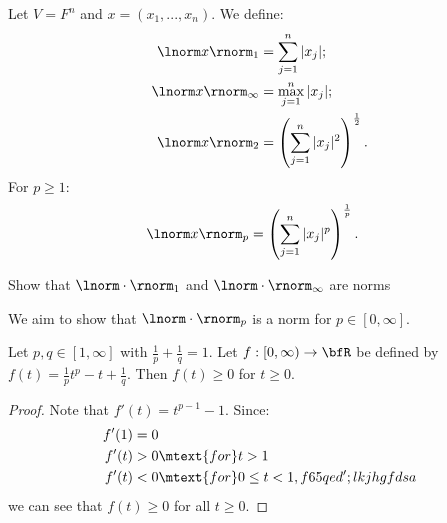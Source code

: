     \begin{example}
        Let $V = F^n$ and $x = (x_1,...,x_n)$. We define:
            \begin{equation*}
            \begin{split}
                \lnorm x \rnorm_1 &= \sum_{j  =1}^n |x_j|; \\
                \lnorm x \rnorm_\infty & = \max_{j=1}^n |x_j|; \\
                \lnorm x \rnorm_2 & = \left( \sum_{j = 1}^n |x_j|^2 \right)^{\frac{1}{2}}.
            \end{split}
            \end{equation*}
        For $p \geq 1$:
            \begin{equation*}
            \begin{split}
                \lnorm x \rnorm_p & = \left( \sum_{j = 1}^n |x_j|^p \right)^\frac{1}{p}.
            \end{split}
            \end{equation*}
    \end{example}

    \begin{exercise}
        Show that $\lnorm \cdot \rnorm_1$ and $\lnorm \cdot \rnorm_\infty$ are norms 
    \end{exercise}

    \begin{center}
    \end{center}

    We aim to show that $\lnorm \cdot \rnorm_p$ is a norm for $p \in [0,\infty]$.

    \begin{lemma}\label{lemma:lemnorm1}
        Let $p,q \in [1,\infty]$ with $\frac{1}{p} + \frac{1}{q} = 1$. Let $f:[0,\infty) \rightarrow \bfR$ be defined by $f(t) = \frac{1}{p}t^p - t + \frac{1}{q}$. Then $f(t) \geq 0$ for $t \geq 0$.
    \end{lemma}
        \begin{proof}
            Note that $f'(t) = t^{p-1} - 1$. Since:
                \begin{equation*}
                \begin{split}
                    f'(1) &= 0 \\
                    f'(t) &> 0 \mtext{for} t>1 \\
                    f'(t) &<0 \mtext{for} 0\leq t < 1,
 f65        qed';lkjhgfdsa                \end{split}
                \end{equation*}
            we can see that $f(t) \geq 0$ for all $t \geq 0$.
        \end{proof}

